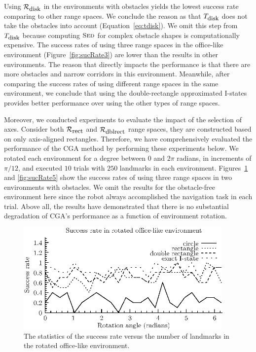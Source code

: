 Using $\mathcal{R}_{\mbox{\small disk}}$ in the environments with obstacles yields the lowest success rate comparing to other range spaces. 
%
We conclude the reason as that $T_{\mbox{\small disk}}$ does not take the obstacles into account
(Equation~\ref{eq:tdisk}). 
%
We omit this step from $T_{\mbox{\small disk}}$ because computing $\textsc{Sed}$ for complex obstacle shapes is computationally expensive. 
%
The success rates of using three range spaces in the office-like environment
(Figure~\ref{fig:sucRate3}) are lower than the results in other
environments. 
%
The reason that directly impacts the performance is that there are more obstacles 
and narrow corridors in this environment. 
%
Meanwhile, after comparing the success rates of using different range spaces in the same environment, 
we conclude that using the double-rectangle approximated I-states provides better
performance over using the other types of range spaces.


Moreover, we conducted experiments to evaluate the impact of the selection of axes. 
%
Consider both $\mathcal{R}_{\mbox{\small rect}}$ and $\mathcal{R}_{\mbox{\small dblrect}}$ range spaces, they are constructed based on only
axis-aligned rectangles. 
Therefore, we have comprehensively evaluated the performance of the CGA method by performing these experiments below.
%
We rotated each environment for a degree between $0$ and $2\pi$ radians, in increments of $\pi/12$, 
and executed $10$ trials with $250$ landmarks in each environment.
%
Figures~\ref{fig:sucRate4} and \ref{fig:sucRate5} show the success rates of
using three range spaces in two environments with obstacles. 
%
We omit the results for the obstacle-free environment here since the robot always accomplished the
navigation task in each trial. 
%
Above all, the results have demonstrated that there is no substantial degradation 
of CGA's performance as a function of environment rotation.


\begin{figure}
  \begin{center}
    \includegraphics[width=0.95\textwidth]{figs/exp_rot_cse}
  \end{center}
  \caption{The statistics of the success rate versus 
    the number of landmarks in the rotated office-like environment.}
  \label{fig:sucRate4}
\end{figure}

